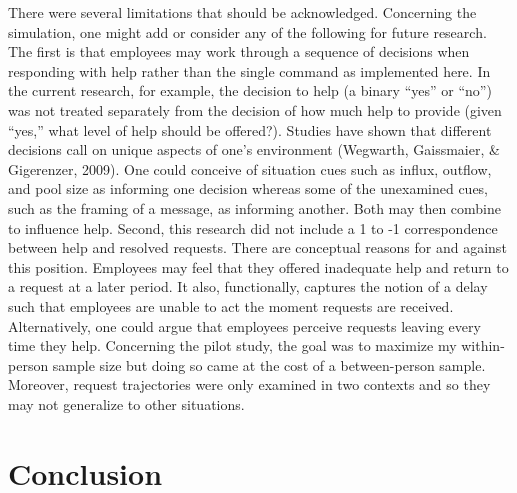 \documentclass[english,,man]{apa6}
\begin{document}
There were several limitations that should be acknowledged. Concerning the simulation, one might add or consider any of the following for future research. The first is that employees may work through a sequence of decisions when responding with help rather than the single command as implemented here. In the current research, for example, the decision to help (a binary \enquote{yes} or \enquote{no}) was not treated separately from the decision of how much help to provide (given \enquote{yes,} what level of help should be offered?). Studies have shown that different decisions call on unique aspects of one's environment (Wegwarth, Gaissmaier, \& Gigerenzer, 2009). One could conceive of situation cues such as influx, outflow, and pool size as informing one decision whereas some of the unexamined cues, such as the framing of a message, as informing another. Both may then combine to influence help. Second, this research did not include a 1 to -1 correspondence between help and resolved requests. There are conceptual reasons for and against this position. Employees may feel that they offered inadequate help and return to a request at a later period. It also, functionally, captures the notion of a delay such that employees are unable to act the moment requests are received. Alternatively, one could argue that employees perceive requests leaving every time they help. Concerning the pilot study, the goal was to maximize my within-person sample size but doing so came at the cost of a between-person sample. Moreover, request trajectories were only examined in two contexts and so they may not generalize to other situations.

\hypertarget{conclusion}{%
\section{Conclusion}\label{conclusion}}
\end{document}
